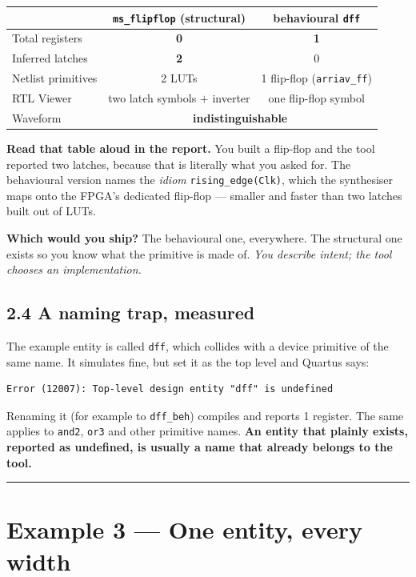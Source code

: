 \documentclass[11pt]{article}
\newcommand{\code}[1]{\texttt{#1}}
\newcommand{\hr}{\vspace{2pt}\hrule\vspace{6pt}}
\begin{document}
\begin{center}
\begin{tabular}{lcc}
\toprule
& \code{ms\_flipflop} (structural) & behavioural \code{dff} \\
\midrule
Total registers & \textbf{0} & \textbf{1} \\
Inferred latches & \textbf{2} & 0 \\
Netlist primitives & 2 LUTs & 1 flip-flop (\code{arriav\_ff}) \\
RTL Viewer & two latch symbols $+$ inverter & one flip-flop symbol \\
Waveform & \multicolumn{2}{c}{\textbf{indistinguishable}} \\
\bottomrule
\end{tabular}
\end{center}

\textbf{Read that table aloud in the report.} You built a flip-flop and the tool
reported two latches, because that is literally what you asked for. The
behavioural version names the \emph{idiom} \code{rising\_edge(Clk)}, which the
synthesiser maps onto the FPGA's dedicated flip-flop --- smaller and faster than
two latches built out of LUTs.

\textbf{Which would you ship?} The behavioural one, everywhere. The structural one
exists so you know what the primitive is made of. \emph{You describe intent; the
tool chooses an implementation.}

\subsection*{2.4 A naming trap, measured}

The example entity is called \code{dff}, which collides with a device primitive of
the same name. It simulates fine, but set it as the top level and Quartus says:

\begin{lstlisting}[language={},numbers=none]
Error (12007): Top-level design entity "dff" is undefined
\end{lstlisting}

Renaming it (for example to \code{dff\_beh}) compiles and reports 1 register. The
same applies to \code{and2}, \code{or3} and other primitive names. \textbf{An
entity that plainly exists, reported as undefined, is usually a name that already
belongs to the tool.}

\vspace{4pt}\hr

\section*{Example 3 --- One entity, every width}
\end{document}
